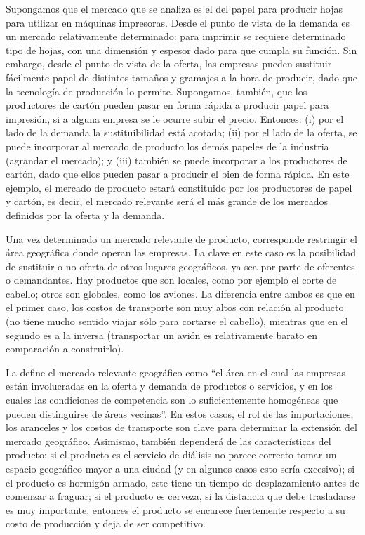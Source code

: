 \documentclass[
  12pt,
  spanish,
]{book}
\begin{document}
Supongamos que el mercado que se analiza es el del papel para producir
hojas para utilizar en máquinas impresoras. Desde el punto de vista de
la demanda es un mercado relativamente determinado: para imprimir se
requiere determinado tipo de hojas, con una dimensión y espesor dado
para que cumpla su función. Sin embargo, desde el punto de vista de la
oferta, las empresas pueden sustituir fácilmente papel de distintos
tamaños y gramajes a la hora de producir, dado que la tecnología de
producción lo permite. Supongamos, también, que los productores de
cartón pueden pasar en forma rápida a producir papel para impresión, si
a alguna empresa se le ocurre subir el precio. Entonces: (i) por el lado
de la demanda la sustituibilidad está acotada; (ii) por el lado de la
oferta, se puede incorporar al mercado de producto los demás papeles de
la industria (agrandar el mercado); y (iii) también se puede incorporar
a los productores de cartón, dado que ellos pueden pasar a producir el
bien de forma rápida. En este ejemplo, el mercado de producto estará
constituido por los productores de papel y cartón, es decir, el mercado
relevante será el más grande de los mercados definidos por la oferta y
la demanda.

Una vez determinado un mercado relevante de producto, corresponde
restringir el área geográfica donde operan las empresas. La clave en
este caso es la posibilidad de sustituir o no oferta de otros lugares
geográficos, ya sea por parte de oferentes o demandantes. Hay productos
que son locales, como por ejemplo el corte de cabello; otros son
globales, como los aviones. La diferencia entre ambos es que en el
primer caso, los costos de transporte son muy altos con relación al
producto (no tiene mucho sentido viajar sólo para cortarse el cabello),
mientras que en el segundo es a la inversa (transportar un avión es
relativamente barato en comparación a construirlo).

La \citet{UE1997} define el mercado relevante geográfico como ``el área
en el cual las empresas están involucradas en la oferta y demanda de
productos o servicios, y en los cuales las condiciones de competencia
son lo suficientemente homogéneas que pueden distinguirse de áreas
vecinas''. En estos casos, el rol de las importaciones, los aranceles y
los costos de transporte son clave para determinar la extensión del
mercado geográfico. Asimismo, también dependerá de las características
del producto: si el producto es el servicio de diálisis no parece
correcto tomar un espacio geográfico mayor a una ciudad (y en algunos
casos esto sería excesivo); si el producto es hormigón armado, este
tiene un tiempo de desplazamiento antes de comenzar a fraguar; si el
producto es cerveza, si la distancia que debe trasladarse es muy
importante, entonces el producto se encarece fuertemente respecto a su
costo de producción y deja de ser competitivo.
\end{document}
